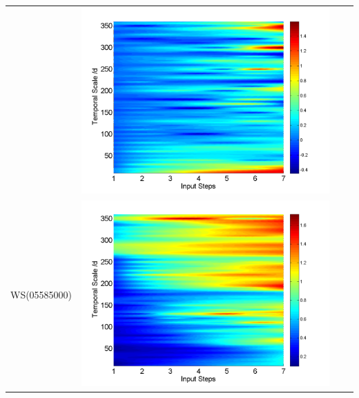 \documentclass[draft,wrr]{AGUTeX}
\begin{document}
\begin{article}
\begin{table}[H]
\begin{tabular}{cccc}
&\begin{minipage}{.3\textwidth}\includegraphics[width=\linewidth]{resultgraph/02143000diff_q.png}\end{minipage}
\\
WS(05585000)
&\begin{minipage}{.3\textwidth}\includegraphics[width=\linewidth]{resultgraph/05585000p.png}\end{minipage}

\end{tabular}
\end{table}
\end{article}
\end{document}
